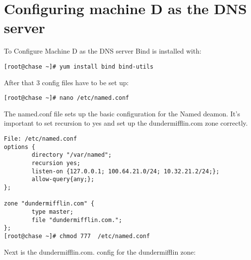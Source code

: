 \documentclass[11pt,onside]{article}
\begin{document}
\section{Configuring machine D as the DNS server}
To Configure Machine D as the DNS server Bind is installed with:
\begin{lstlisting}
[root@chase ~]# yum install bind bind-utils
\end{lstlisting}
After that 3 config files have to be set up:
\begin{lstlisting}
[root@chase ~]# nano /etc/named.conf
\end{lstlisting}
The named.conf file sets up the basic configuration for the Named deamon. It's important to set recursion to yes and set up the dundermifflin.com zone correctly.
\begin{lstlisting}
File: /etc/named.conf
options {
        directory "/var/named";
        recursion yes;
        listen-on {127.0.0.1; 100.64.21.0/24; 10.32.21.2/24;};
        allow-query{any;};
};

zone "dundermifflin.com" {
        type master;
        file "dundermifflin.com.";
};
[root@chase ~]# chmod 777  /etc/named.conf
\end{lstlisting}
Next is the dundermifflin.com. config for the dundermifflin zone:
\end{document}
